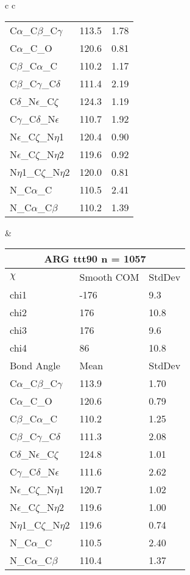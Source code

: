 \begin{longtable}{ c c }
\begin{tabular}{ l l l }
  C$\alpha$\_C$\beta$\_C$\gamma$ & 113.5 & 1.78\\
  C$\alpha$\_C\_O & 120.6 & 0.81\\
  C$\beta$\_C$\alpha$\_C & 110.2 & 1.17\\
  C$\beta$\_C$\gamma$\_C$\delta$ & 111.4 & 2.19\\
  C$\delta$\_N$\epsilon$\_C$\zeta$ & 124.3 & 1.19\\
  C$\gamma$\_C$\delta$\_N$\epsilon$ & 110.7 & 1.92\\
  N$\epsilon$\_C$\zeta$\_N$\eta$1 & 120.4 & 0.90\\
  N$\epsilon$\_C$\zeta$\_N$\eta$2 & 119.6 & 0.92\\
  N$\eta$1\_C$\zeta$\_N$\eta$2 & 120.0 & 0.81\\
  N\_C$\alpha$\_C & 110.5 & 2.41\\
  N\_C$\alpha$\_C$\beta$ & 110.2 & 1.39\\
  \bottomrule
  \end{tabular}
  &
  \begin{tabular}{ l l l }
  \toprule
  \multicolumn{3}{c}{ARG \textbf{ttt90} n = 1057} \\ \toprule
  $\chi$       & Smooth COM & StdDev \\ \midrule
  chi1 & -176 & 9.3 \\ 
  chi2 & 176 & 10.8 \\ 
  chi3 & 176 & 9.6 \\ 
  chi4 & 86 & 10.8 \\ \midrule
  Bond Angle   & Mean     & StdDev \\ \midrule
  C$\alpha$\_C$\beta$\_C$\gamma$ & 113.9 & 1.70\\
  C$\alpha$\_C\_O & 120.6 & 0.79\\
  C$\beta$\_C$\alpha$\_C & 110.2 & 1.25\\
  C$\beta$\_C$\gamma$\_C$\delta$ & 111.3 & 2.08\\
  C$\delta$\_N$\epsilon$\_C$\zeta$ & 124.8 & 1.01\\
  C$\gamma$\_C$\delta$\_N$\epsilon$ & 111.6 & 2.62\\
  N$\epsilon$\_C$\zeta$\_N$\eta$1 & 120.7 & 1.02\\
  N$\epsilon$\_C$\zeta$\_N$\eta$2 & 119.6 & 1.00\\
  N$\eta$1\_C$\zeta$\_N$\eta$2 & 119.6 & 0.74\\
  N\_C$\alpha$\_C & 110.5 & 2.40\\
  N\_C$\alpha$\_C$\beta$ & 110.4 & 1.37\\
  \bottomrule

\end{tabular}
\end{longtable}
